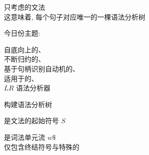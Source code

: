 
\begin{frame}{}
  \begin{center}
    只考虑的文法 \\[4pt]
    这意味着, 每个句子对应唯一的一棵语法分析树


    今日份主题: 
  \end{center}
\end{frame}

\begin{frame}{}
  \begin{center}
    自底向上的、\\[15pt]
    不断归约的、\\[15pt]
    基于句柄识别自动机的、\\[15pt]
    适用于的、\\[15pt]
    $LR$ 语法分析器
  \end{center}
\end{frame}

\begin{frame}{}
  \begin{center}
    {\large {}构建语法分析树}

    \vspace{0.60cm}
    是文法的起始符号 $S$

    \vspace{1.00cm}

    \vspace{1.00cm}
    是词法单元流 $w\$$ \\[8pt]
    仅包含终结符号与特殊的
  \end{center}
\end{frame}

